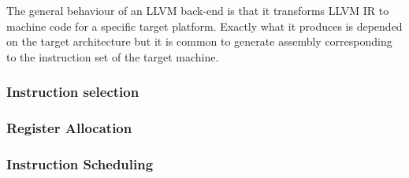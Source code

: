 The general behaviour of an LLVM back-end is that it transforms LLVM IR to machine code
for a specific target platform. Exactly what it produces is depended on the target architecture
but it is common to generate assembly corresponding to the instruction set of the target
machine.

\subsubsection{Instruction selection}


\subsubsection{Register Allocation}

\subsubsection{Instruction Scheduling}
